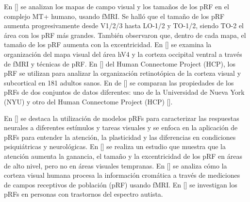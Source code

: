 En [\cite{amano_visual_2009}] se analizan los mapas de campo visual y los tamaños de los pRF en el complejo MT+ humano, usando fMRI. Se halló que el tamaño de los pRF aumenta progresivamente desde V1/2/3 hasta LO-1/2 y TO-1/2, siendo TO-2 el área con los pRF más grandes. También observaron que, dentro de cada mapa, el tamaño de los pRF aumenta con la excentricidad. En [\cite{winawer_mapping_2010}] se examina la organización del mapa visual del área hV4 y la corteza occipital ventral a través de fMRI y técnicas de pRF. En [\cite{benson_human_2018}] del Human Connectome Project (HCP), los pRF se utilizan para analizar la organización retinotópica de la corteza visual y subcortical en 181 adultos sanos. En de [\cite{himmelberg_cross-dataset_2021}] se comparan las propiedades de los pRFs de dos conjuntos de datos diferentes: uno de la Universidad de Nueva York (NYU) y otro del Human Connectome Project (HCP) [\cite{benson_human_2018}].

En [\cite{wandell_computational_2015}] se destaca la utilización de modelos pRFs para caracterizar las respuestas neurales a diferentes estímulos y tareas visuales y se enfoca en la aplicación de pRFs para entender la atención, la plasticidad y las diferencias en condiciones psiquiátricas y neurológicas. En [\cite{kay_attention_2015}] se realiza un estudio que muestra que la atención aumenta la ganancia, el tamaño y la excentricidad de los pRF en áreas de alto nivel, pero no en áreas visuales tempranas. En [\cite{welbourne_population_2018}] se analiza cómo la corteza visual humana procesa la información cromática a través de mediciones de campos receptivos de población (pRF) usando fMRI. En [\cite{schwarzkopf_larger_2014}] se investigan los pRFs en personas con trastornos del espectro autista.




